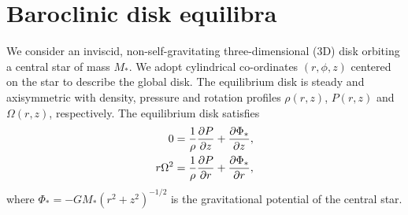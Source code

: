 \section{Baroclinic disk equilibra}
We consider  an inviscid, non-self-gravitating three-dimensional (3D)
disk orbiting a central star of mass $M_*$. 
We adopt cylindrical
co-ordinates $(r,\phi, z)$ centered on the star to describe the global
disk. The equilibrium disk is steady and axisymmetric with density,
pressure and rotation profiles $\rho(r,z)$, $P(r,z)$ and
$\Omega(r,z)$, respectively. The equilibrium disk satisfies
\begin{align}
  0 &= \frac{1}{\rho}\frac{\partial P}{\partial z} + \frac{\partial \Phi_*}{\partial z},\label{vert_equilibrium}\\
  r\Omega^2&= \frac{1}{\rho}\frac{\partial P}{\partial r} + \frac{\partial \Phi_*}{\partial
    r},\label{hori_equilibrium} 
\end{align} 
where $\Phi_* = -GM_*(r^2 + z^2)^{-1/2}$ is the gravitational
potential of the central star.

